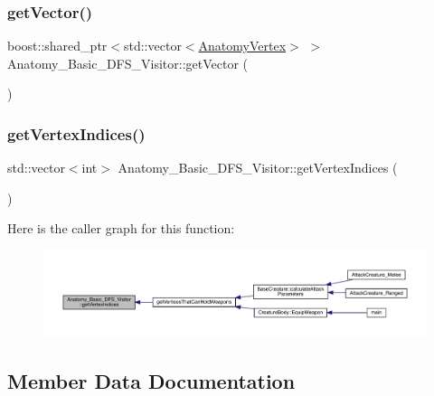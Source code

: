 \subsubsection{\texorpdfstring{get\+Vector()}{getVector()}}
{\footnotesize\ttfamily boost\+::shared\+\_\+ptr$<$std\+::vector$<$\mbox{\hyperlink{_body_graph_8hpp_aeb92fc7b3eed88cf25a4fc7b708a66cf}{Anatomy\+Vertex}}$>$ $>$ Anatomy\+\_\+\+Basic\+\_\+\+D\+F\+S\+\_\+\+Visitor\+::get\+Vector (\begin{DoxyParamCaption}{ }\end{DoxyParamCaption})\hspace{0.3cm}{\ttfamily [inline]}}

\mbox{\label{class_anatomy___basic___d_f_s___visitor_aa4d4a9a684cd4ab15c965d3044530b76}} 
\subsubsection{\texorpdfstring{get\+Vertex\+Indices()}{getVertexIndices()}}
{\footnotesize\ttfamily std\+::vector$<$int$>$ Anatomy\+\_\+\+Basic\+\_\+\+D\+F\+S\+\_\+\+Visitor\+::get\+Vertex\+Indices (\begin{DoxyParamCaption}{ }\end{DoxyParamCaption})\hspace{0.3cm}{\ttfamily [inline]}}

Here is the caller graph for this function\+:
\nopagebreak
\begin{figure}[H]
\begin{center}
\leavevmode
\includegraphics[width=350pt]{class_anatomy___basic___d_f_s___visitor_aa4d4a9a684cd4ab15c965d3044530b76_icgraph}
\end{center}
\end{figure}


\subsection{Member Data Documentation}
\mbox{\label{class_anatomy___basic___d_f_s___visitor_a0b28d945f501686b8037b49bb9ab75b2}} 
